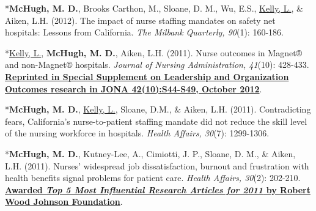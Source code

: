 \documentclass[10pt,]{article}
\begin{document}
{{{{{{{{{{{{{{\begin{hangparas}{.25in}{1}
\end{hangparas}

\vspace{4mm}

\begin{hangparas}{.25in}{1}

*{\textbf {McHugh, M. D.}}, Brooks Carthon, M., Sloane, D. M., Wu, E.S., {\underline {Kelly, L.}}, \& Aiken, L.H. (2012). The impact of nurse staffing mandates on safety net hospitals: Lessons from California. {\textit {The Milbank Quarterly, 90}}(1): 160-186.

\end{hangparas}

\vspace{4mm}

\begin{hangparas}{.25in}{1}

*{\underline {Kelly, L.}}, {\textbf {McHugh, M. D.}}, Aiken, L.H. (2011). Nurse outcomes in Magnet® and non-Magnet® hospitals. {\textit {Journal of Nursing Administration, 41}}(10): 428-433. {\textbf {\underline {Reprinted in Special Supplement on Leadership and Organization Outcomes research in JONA 42(10):S44-S49, October 2012}}}.

\end{hangparas}

\vspace{4mm}

\begin{hangparas}{.25in}{1}

*{\textbf {McHugh, M. D.}}, {\underline {Kelly, L.}}, Sloane, D.M., \& Aiken, L.H. (2011). Contradicting fears, California’s nurse-to-patient staffing mandate did not reduce the skill level of the nursing workforce in hospitals. {\textit {Health Affairs, 30}}(7): 1299-1306.

\end{hangparas}

\vspace{4mm}

\begin{hangparas}{.25in}{1}

{*\textbf {McHugh, M. D.}}, Kutney-Lee, A., Cimiotti, J. P., Sloane, D. M., \& Aiken, L.H. (2011). Nurses’ widespread job dissatisfaction, burnout and frustration with health benefits signal problems for patient care. {\textit {Health Affairs, 30}}(2): 202-210. {\textbf {\underline {Awarded {\textit {Top 5 Most Influential Research Articles for 2011}} by Robert Wood Johnson Foundation}}}.


\end{hangparas}}}}}}}}}}}}}}}
\end{document}
